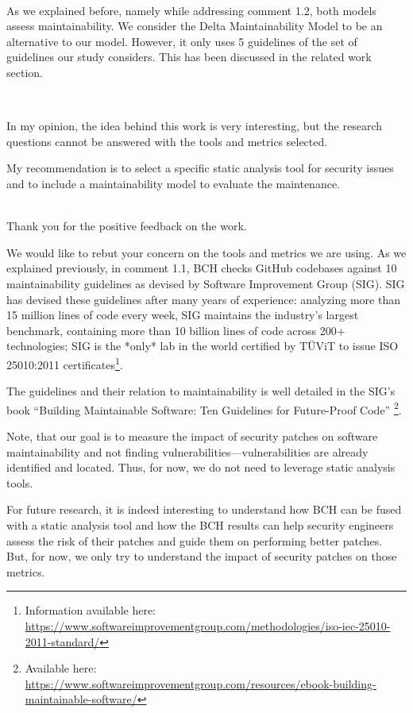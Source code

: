 \documentclass[11pt,fleqn]{article}
\newcommand{\eline}{\vspace*{.75\baselineskip}}
\newcommand{\Referee}[1]{\eline \noindent {\bf Reviewer comment #1:} \\}
\newcommand{\Us}{\eline \noindent {\bf Response:}\\}
\newenvironment{revcomment}[1][]
{\Referee{#1}\begin{rcomment}}
{\end{rcomment}}
\begin{document}
\Us As we explained before, namely while addressing comment 1.2, both models assess 
maintainability. We consider the Delta Maintainability 
Model to be an alternative to our model. However, it only uses 5 guidelines of the 
set of guidelines our study considers. This has been 
discussed in the related work section.


\begin{revcomment}[1.5]

    In my opinion, the idea behind this work is very interesting, 
    but the research questions cannot be answered with the tools 
    and metrics selected. 

    My recommendation is to select a specific static analysis tool 
    for security issues and to include a maintainability model to 
    evaluate the maintenance.

\end{revcomment}

\Us Thank you for the positive feedback on the work. 

We would like to rebut your concern on the tools and 
metrics we are using. As we explained previously, in comment 1.1, 
BCH checks GitHub codebases against 10 maintainability guidelines 
as devised by Software Improvement Group (SIG). SIG has devised 
these guidelines after many years of experience: analyzing more 
than 15 million lines of code every week, SIG maintains the industry’s largest 
benchmark, containing more than 10 billion lines of code across 200+ technologies; SIG 
is the *only* lab in the world certified by TÜViT to issue ISO 25010:2011 
certificates\footnote{Information available here: 
\url{https://www.softwareimprovementgroup.com/methodologies/iso-iec-25010-2011-standard/}}.

The guidelines and their relation to maintainability is well 
detailed in the SIG's book ``Building Maintainable 
Software: Ten Guidelines for Future-Proof Code''
\footnote{Available here: \url{https://www.softwareimprovementgroup.com/resources/ebook-building-maintainable-software/}}.

Note, that our goal is to measure the impact of security patches on software 
maintainability and not finding vulnerabilities---vulnerabilities
are already identified and located. Thus, for now, 
we do not need to leverage static analysis tools. 

For future research, it is indeed interesting to 
understand how BCH can be fused with a static analysis tool 
and how the BCH results can help 
security engineers assess the risk of their patches and guide 
them on performing better patches. But, for now, we only try
to understand the impact of security patches on those metrics.
\end{document}

